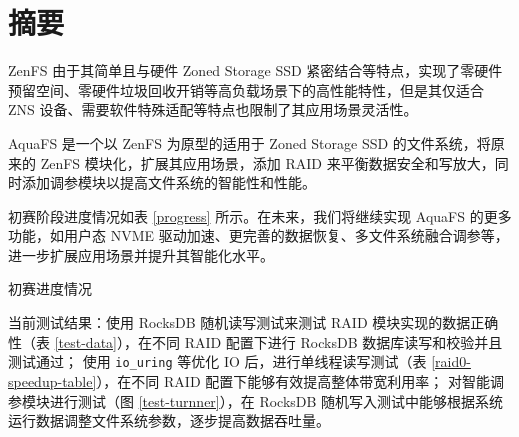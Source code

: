 \section*{摘要}

ZenFS 由于其简单且与硬件 Zoned Storage SSD 紧密结合等特点，实现了零硬件预留空间、零硬件垃圾回收开销等高负载场景下的高性能特性，但是其仅适合 ZNS 设备、需要软件特殊适配等特点也限制了其应用场景灵活性。

AquaFS 是一个以 ZenFS 为原型的适用于 Zoned Storage SSD 的文件系统，将原来的 ZenFS 模块化，扩展其应用场景，添加 RAID 来平衡数据安全和写放大，同时添加调参模块以提高文件系统的智能性和性能。

初赛阶段进度情况如表 \ref{progress} 所示。在未来，我们将继续实现 AquaFS 的更多功能，如用户态 NVME 驱动加速、更完善的数据恢复、多文件系统融合调参等，进一步扩展应用场景并提升其智能化水平。

\begin{table}[htbp]
  \centering
  \caption{初赛进度情况}
  \label{progress}
  
\end{table}

当前测试结果：使用 RocksDB 随机读写测试来测试 RAID 模块实现的数据正确性（表 \ref{test-data}），在不同 RAID 配置下进行 RocksDB 数据库读写和校验并且测试通过；
使用 \verb|io_uring| 等优化 IO 后，进行单线程读写测试（表 \ref{raid0-speedup-table}），在不同 RAID 配置下能够有效提高整体带宽利用率；
对智能调参模块进行测试（图 \ref{test-turnner}），在 RocksDB 随机写入测试中能够根据系统运行数据调整文件系统参数，逐步提高数据吞吐量。